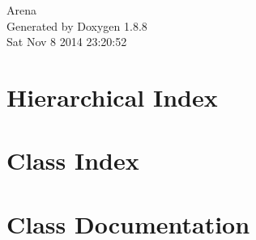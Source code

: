 \documentclass[twoside]{book}
\newcommand{\+}{\discretionary{\mbox{\scriptsize$\hookleftarrow$}}{}{}}
\newcommand{\clearemptydoublepage}{%
  \newpage{\pagestyle{empty}\cleardoublepage}%
}
\begin{document}
\hypersetup{pageanchor=false,
             bookmarks=true,
             bookmarksnumbered=true,
             pdfencoding=unicode
            }
\begin{titlepage}
\vspace*{7cm}
\begin{center}%
{\Large Arena }\\
\vspace*{1cm}
{\large Generated by Doxygen 1.8.8}\\
\vspace*{0.5cm}
{\small Sat Nov 8 2014 23:20:52}\\
\end{center}
\end{titlepage}
\clearemptydoublepage
\tableofcontents
\clearemptydoublepage
{}
\hypersetup{pageanchor=true}

\chapter{Hierarchical Index}

\chapter{Class Index}

\chapter{Class Documentation}

































\newpage
{}
{}
\printindex
\end{document}
